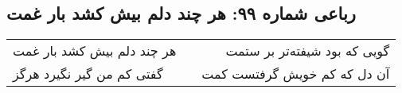 \begin{center}
\section*{رباعی شماره ۹۹: هر چند دلم بیش کشد بار غمت}
\label{sec:sh099}
\begin{longtable}{l p{0.5cm} r}
هر چند دلم بیش کشد بار غمت
&&
گویی که بود شیفته‌تر بر ستمت
\\
گفتی کم من گیر نگیرد هرگز
&&
آن دل که کم خویش گرفتست کمت
\\
\end{longtable}
\end{center}
